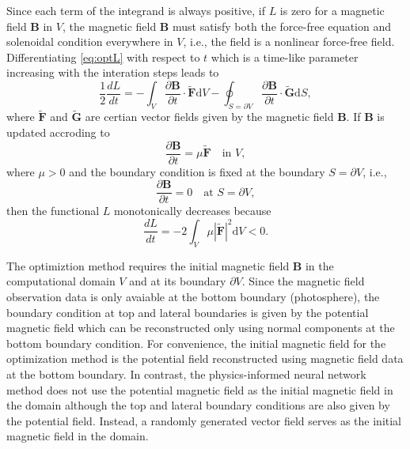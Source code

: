 Since each term of the integrand is always positive, if $L$ is zero for a magnetic field $\mathbf{B}$ in $V$, the magnetic field $\mathbf{B}$ must satisfy both the force-free equation and solenoidal condition everywhere in $V$, i.e., the field is a nonlinear force-free field. Differentiating \cref{eq:optL} with respect to $t$ which is a time-like parameter increasing with the interation steps leads to 
\begin{equation*}
    \frac{1}{2} \frac{dL}{dt} = - \int_V \frac{\partial \mathbf{B}}{\partial t}\cdot \tilde{\mathbf{F}} \mathrm{d}V - \oint_{S=\partial V} \frac{\partial \mathbf{B}}{\partial t}\cdot \tilde{\mathbf{G}}\mathrm{d}S,
\end{equation*}
where $\tilde{\mathbf{F}}$ and $\tilde{\mathbf{G}}$ are certian vector fields given by the magnetic field $\mathbf{B}$. If $\mathbf{B}$ is updated accroding to 
\begin{equation*}
    \frac{\partial \mathbf{B}}{\partial t} = \mu \tilde{\mathbf{F}} \quad \text{in } V,
\end{equation*}
where $\mu > 0$ and the boundary condition is fixed at the boundary $S=\partial V$, i.e., 
\begin{equation*}
    \frac{\partial{\mathbf{B}}}{\partial t} = 0 \quad \text{at } S=\partial V,
\end{equation*}
then the functional $L$ monotonically decreases because
\begin{equation*}
\frac{d L}{d t} = - 2\int_V \mu |\tilde{\mathbf{F}}|^2 \mathrm{d}V < 0.
\end{equation*}

The optimiztion method requires the initial magnetic field $\mathbf{B}$ in the computational domain $V$ and at its boundary $\partial V$. 
Since the magnetic field observation data is only avaiable at the bottom boundary (photosphere), the boundary condition at top and lateral boundaries is given by the potential magnetic field which can be reconstructed only using normal components at the bottom boundary condition. For convenience, the initial magnetic field for the optimization method is the potential field reconstructed using magnetic field data at the bottom boundary. In contrast, the physics-informed neural network method does not use the potential magnetic field as the initial magnetic field in the domain although the top and lateral boundary conditions are also given by the potential field. Instead, a randomly generated vector field serves as the initial magnetic field in the domain.

